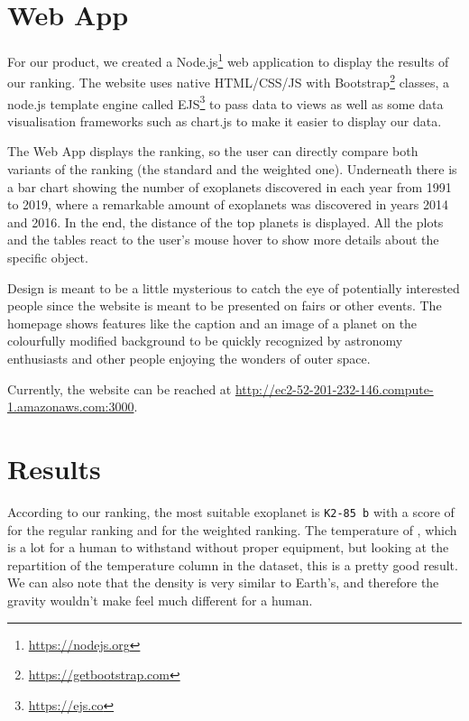\documentclass[12p]{article}
\begin{document}

\section{Web App}
For our product, we created a Node.js\footnote{\url{https://nodejs.org}} web application to display the results of our ranking. The website uses native HTML/CSS/JS with Bootstrap\footnote{\url{https://getbootstrap.com}} classes, a node.js template engine called EJS\footnote{\url{https://ejs.co}} to pass data to views as well as some data visualisation frameworks such as chart.js to make it easier to display our data.

The Web App displays the ranking, so the user can directly compare both variants of the ranking (the standard and the weighted one). Underneath there is a bar chart showing the number of exoplanets discovered in each year from 1991 to 2019, where a remarkable amount of exoplanets was discovered in years 2014 and 2016. In the end, the distance of the top  planets is displayed. All the plots and the tables react to the user's mouse hover to show more details about the specific object.

Design is meant to be a little mysterious to catch the eye of potentially interested people since the website is meant to be presented on fairs or other events. The homepage shows features like the caption and an image of a planet on the colourfully modified background to be quickly recognized by astronomy enthusiasts and other people enjoying the wonders of outer space.

Currently, the website can be reached at \url{http://ec2-52-201-232-146.compute-1.amazonaws.com:3000}.


\section{Results}
According to our ranking, the most suitable exoplanet is \verb|K2-85 b| with a score of  for the regular ranking and  for the weighted ranking. The temperature of , which is a lot for a human to withstand without proper equipment, but looking at the repartition of the temperature column in the dataset, this is a pretty good result. We can also note that the density is very similar to Earth's, and therefore the gravity wouldn't make feel much different for a human.
\end{document}

